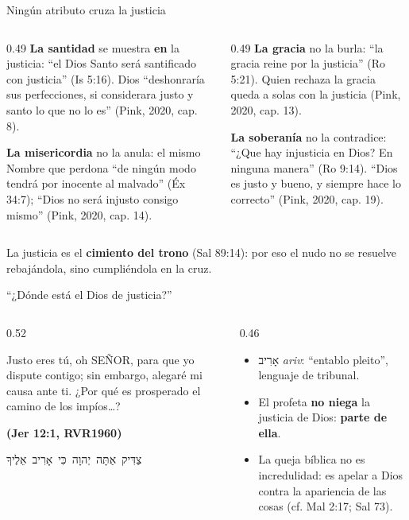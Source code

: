 \documentclass[hyperref={bookmarks=false},aspectratio=169]{beamer}
\newcommand{\heb}[1]{\mbox{\foreignlanguage{hebrew}{#1}}}
\newcommand{\SENOR}{S{\fontsize{0.78em}{1em}\selectfont EÑOR}}
\newcommand{\fuente}[1]{\par\hfill{\upshape\bfseries\footnotesize\textcolor{azul}{#1}}}
\newcommand{\destacar}[1]{\textbf{\textcolor{azul}{#1}}}
\begin{document}
\begin{frame}{Ningún atributo cruza la justicia}
\begin{columns}[t,onlytextwidth]
\begin{column}{0.49\textwidth}\small
\textbf{\color{azul}La santidad} se muestra \destacar{en} la justicia: ``el Dios Santo será santificado con justicia'' (Is 5:16). Dios ``deshonraría sus perfecciones, si considerara justo y santo lo que no lo es'' (Pink, 2020, cap. 8).\par\medskip
\textbf{\color{azul}La misericordia} no la anula: el mismo Nombre que perdona ``de ningún modo tendrá por inocente al malvado'' (Éx 34:7); ``Dios no será injusto consigo mismo'' (Pink, 2020, cap. 14).
\end{column}
\begin{column}{0.49\textwidth}\small
\textbf{\color{azul}La gracia} no la burla: ``la gracia reine por la justicia'' (Ro 5:21). Quien rechaza la gracia queda a solas con la justicia (Pink, 2020, cap. 13).\par\medskip
\textbf{\color{azul}La soberanía} no la contradice: ``¿Que hay injusticia en Dios? En ninguna manera'' (Ro 9:14). ``Dios es justo y bueno, y siempre hace lo correcto'' (Pink, 2020, cap. 19).
\end{column}
\end{columns}\par\medskip
\small La justicia es el \destacar{cimiento del trono} (Sal 89:14): por eso el nudo no se resuelve rebajándola, sino cumpliéndola en la cruz.
\end{frame}


\begin{frame}{``¿Dónde está el Dios de justicia?''}
\begin{columns}[c,onlytextwidth]
\begin{column}{0.52\textwidth}
\begin{cita}Justo eres tú, oh \SENOR, para que yo dispute contigo; sin embargo, alegaré mi causa ante ti. ¿Por qué es prosperado el camino de los impíos\ldots?\fuente{(Jer 12:1, RVR1960)}\end{cita}
\begin{center}\small\heb{צַדִּיק אַתָּה יְהוָה כִּי אָרִיב אֵלֶיךָ}\end{center}
\end{column}
\begin{column}{0.46\textwidth}\small
\begin{itemize}
\item \heb{אָרִיב} \emph{ariv}: ``entablo pleito'', lenguaje de tribunal.
\item El profeta \destacar{no niega} la justicia de Dios: \destacar{parte de ella}.
\item La queja bíblica no es incredulidad: es apelar a Dios contra la apariencia de las cosas (cf. Mal 2:17; Sal 73).
\end{itemize}
\end{column}
\end{columns}
\end{frame}
\end{document}

